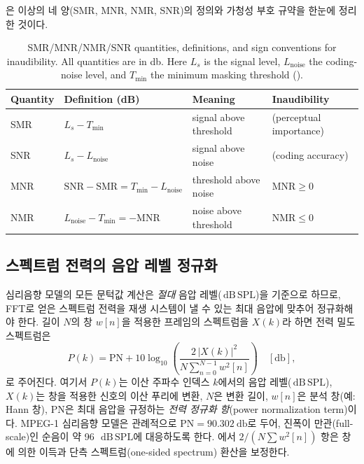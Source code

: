 \documentclass[11pt,a4paper]{article}
\newcommand{\dBSPL}{\ensuremath{\,\mathrm{dB\,SPL}}}  %
\newcommand{\SMR}{\mathrm{SMR}}                        %
\newcommand{\MNR}{\mathrm{MNR}}                        %
\newcommand{\NMR}{\mathrm{NMR}}                        %
\newcommand{\SNR}{\mathrm{SNR}}                        %
\begin{document}
은 이상의 네 양(SMR, MNR, NMR, SNR)의 정의와 가청성 부호 규약을
한눈에 정리한 것이다.

\begin{table}[htbp]
  \centering
  \caption{SMR/MNR/NMR/SNR quantities, definitions, and sign conventions for
           inaudibility. All quantities are in \si{\decibel}. Here $L_{s}$ is the
           signal level, $L_{\mathrm{noise}}$ the coding-noise level, and
           $T_{\min}$ the minimum masking threshold ().}
  \label{tab:smrnmr}
  \begin{tabular}{@{}llll@{}}
    \toprule
    Quantity & Definition (dB) & Meaning & Inaudibility \\
    \midrule
    SMR & $L_{s} - T_{\min}$ & signal above threshold & (perceptual importance) \\
    SNR & $L_{s} - L_{\mathrm{noise}}$ & signal above noise & (coding accuracy) \\
    MNR & $\SNR - \SMR = T_{\min} - L_{\mathrm{noise}}$ & threshold above noise & $\MNR \ge 0$ \\
    NMR & $L_{\mathrm{noise}} - T_{\min} = -\MNR$ & noise above threshold & $\NMR \le 0$ \\
    \bottomrule
  \end{tabular}
\end{table}

\subsection{스펙트럼 전력의 음압 레벨 정규화}
심리음향 모델의 모든 문턱값 계산은 \emph{절대} 음압 레벨(\dBSPL)을 기준으로 하므로,
FFT로 얻은 스펙트럼 전력을 재생 시스템이 낼 수 있는 최대 음압에 맞추어 정규화해야
한다. 길이 $N$의 창 $w[n]$을 적용한 프레임의 스펙트럼을 $X(k)$라 하면 전력 밀도
스펙트럼은
\begin{equation}\label{eq:psd}
  P(k) = \mathrm{PN} + 10\log_{10}\!\left(\frac{2\,|X(k)|^{2}}
         {N \sum_{n=0}^{N-1} w^{2}[n]}\right) \quad [\si{\decibel}],
\end{equation}
로 주어진다. 여기서 $P(k)$는 이산 주파수 인덱스 $k$에서의 음압 레벨(\dBSPL),
$X(k)$는 창을 적용한 신호의 이산 푸리에 변환, $N$은 변환 길이, $w[n]$은 분석
창(예: Hann 창), $\mathrm{PN}$은 최대 음압을 규정하는 \emph{전력 정규화
항}(power normalization term)이다. MPEG-1 심리음향 모델은 관례적으로
$\mathrm{PN}=\SI{90.302}{\decibel}$로 두어, 진폭이 만관(full-scale)인 순음이 약
\SI{96}{\dBSPL}에 대응하도록 한다. 에서 $2/(N\sum w^{2}[n])$ 항은 창에
의한 이득과 단측 스펙트럼(one-sided spectrum) 환산을 보정한다.
\end{document}
